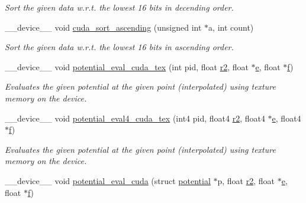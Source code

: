 \begin{DoxyCompactItemize}
\begin{DoxyCompactList}\small\item\em Sort the given data w.\-r.\-t. the lowest 16 bits in decending order. \end{DoxyCompactList}\item 
\-\_\-\-\_\-device\-\_\-\-\_\- void \hyperlink{runner__cuda_8cu_a01c8032e5d4495edadcc8540a36bba7e}{cuda\-\_\-sort\-\_\-ascending} (unsigned int $\ast$a, int count)
\begin{DoxyCompactList}\small\item\em Sort the given data w.\-r.\-t. the lowest 16 bits in ascending order. \end{DoxyCompactList}\item 
\-\_\-\-\_\-device\-\_\-\-\_\- void \hyperlink{runner__cuda_8cu_a4f847a3ee804e94e33154c1b0b3c1d26}{potential\-\_\-eval\-\_\-cuda\-\_\-tex} (int pid, float \hyperlink{potential__eval_8h_aaa7f6ac275af5eb6de39bc858a218035}{r2}, float $\ast$\hyperlink{potential__eval_8h_ac54d1391e6657558123088943f721021}{e}, float $\ast$\hyperlink{potential__eval_8h_a750f2e921706f49e7b9a819b8405f6c1}{f})
\begin{DoxyCompactList}\small\item\em Evaluates the given potential at the given point (interpolated) using texture memory on the device. \end{DoxyCompactList}\item 
\-\_\-\-\_\-device\-\_\-\-\_\- void \hyperlink{runner__cuda_8cu_ad7ac64705f23cc0ce5d9d73369162309}{potential\-\_\-eval4\-\_\-cuda\-\_\-tex} (int4 pid, float4 \hyperlink{potential__eval_8h_aaa7f6ac275af5eb6de39bc858a218035}{r2}, float4 $\ast$\hyperlink{potential__eval_8h_ac54d1391e6657558123088943f721021}{e}, float4 $\ast$\hyperlink{potential__eval_8h_a750f2e921706f49e7b9a819b8405f6c1}{f})
\begin{DoxyCompactList}\small\item\em Evaluates the given potential at the given point (interpolated) using texture memory on the device. \end{DoxyCompactList}\item 
\-\_\-\-\_\-device\-\_\-\-\_\- void \hyperlink{runner__cuda_8cu_a84663dbc518d6061f158eee8652d1c45}{potential\-\_\-eval\-\_\-cuda} (struct \hyperlink{structpotential}{potential} $\ast$p, float \hyperlink{potential__eval_8h_aaa7f6ac275af5eb6de39bc858a218035}{r2}, float $\ast$\hyperlink{potential__eval_8h_ac54d1391e6657558123088943f721021}{e}, float $\ast$\hyperlink{potential__eval_8h_a750f2e921706f49e7b9a819b8405f6c1}{f})

\end{DoxyCompactItemize}
